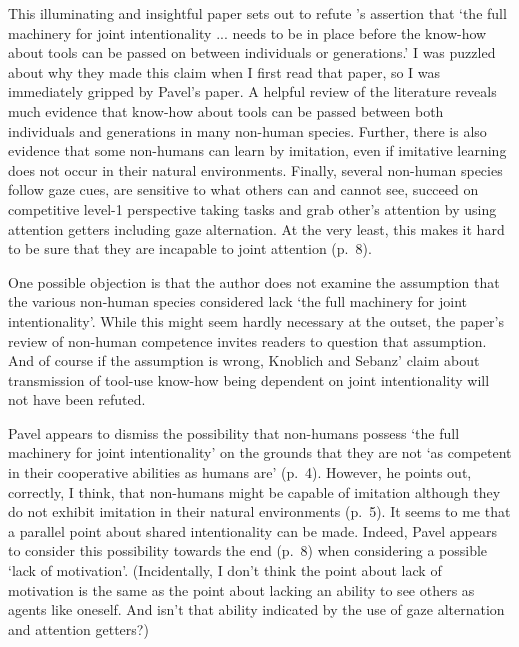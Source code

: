 \documentclass[12pt,a4paper]{extarticle}
\begin{document}
\setlength\footnotesep{1em}


\author{}
\date{}


\maketitle


This illuminating and insightful paper sets out to refute 
\citet[p.\ 2027]{Knoblich:2008hy}’s assertion that ‘the full machinery for joint intentionality ... needs to be in place before the know-how about tools can be passed on between individuals or generations.’
I was puzzled about why they made this claim when I first read that paper, so I was immediately gripped by Pavel’s paper.
A helpful review of the literature reveals much evidence that know-how about tools can be passed between both individuals and generations in many non-human species.
Further, there is also evidence that some non-humans can learn by imitation, even  if imitative learning does not occur in their natural environments.
Finally, several non-human species follow gaze cues, are sensitive to what others can and cannot see, succeed on competitive level-1 perspective taking tasks and grab other’s attention by using attention getters including gaze alternation.
At the very least, this makes it hard to be sure that they are incapable to joint attention (p.\ 8).

One possible objection is that the author does not examine the assumption that the various non-human species considered lack ‘the full machinery for joint intentionality’.
While this might seem hardly necessary at the outset, the paper’s review of non-human competence invites readers to question that assumption.
And of course if the assumption is wrong, Knoblich and Sebanz’ claim about transmission of tool-use know-how being dependent on joint intentionality will not have been refuted.

Pavel appears to dismiss the possibility that non-humans possess ‘the full machinery for joint intentionality’ on the grounds that they are not ‘as competent in their cooperative abilities as humans are’ (p.\ 4). 
However, he points out, correctly, I think, that non-humans might be capable of imitation although they do not exhibit imitation in their natural environments (p.\ 5).
It seems to me that a parallel point about shared intentionality can be made.
Indeed, Pavel appears to consider this possibility towards the end (p.\ 8) when considering a possible ‘lack of motivation’.
(Incidentally, I don’t think the point about lack of motivation is the same as the point about lacking an ability to see others as agents like oneself.
And isn’t that ability indicated by the use of gaze alternation and attention getters?)
\end{document}
